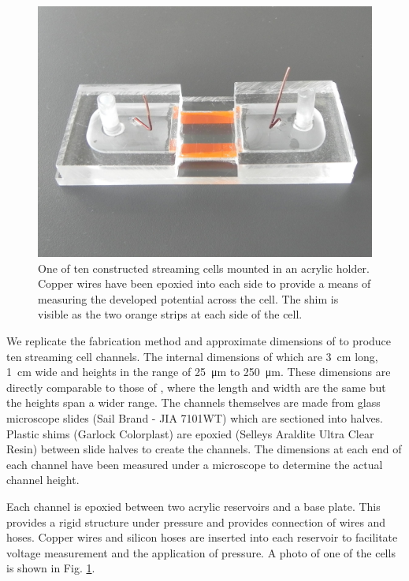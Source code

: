\documentclass[10pt,final,journal]{IEEEtran}
\begin{document}
    \begin{figure}
        \begin{center}
        \includegraphics[width=\linewidth]{Photo_streamingPotential_Assembly_Step3.JPG}
        \end{center}
        \caption{One of ten constructed streaming cells mounted in an acrylic holder. Copper wires have been epoxied into each side to provide a means of measuring the developed potential across the cell. The shim is visible as the two orange strips at each side of the cell.}
        \label{fig:cell}
    \end{figure}

    We replicate the fabrication method and approximate dimensions of \cite{Gu2000} to produce ten streaming cell channels.
    The internal dimensions of which are \SI{3}{\centi\metre} long, \SI{1}{\centi\metre} wide and heights in the range of \SI{25}{\micro\metre} to \SI{250}{\micro\metre}.
    These dimensions are directly comparable to those of \cite{Gu2000}, where the length and width are the same but the heights span a wider range.
    The channels themselves are made from glass microscope slides (Sail Brand - JIA 7101WT) which are sectioned into halves.
    Plastic shims (Garlock Colorplast) are epoxied (Selleys Araldite Ultra Clear Resin) between slide halves to create the channels.
    The dimensions at each end of each channel have been measured under a microscope to determine the actual channel height.

    Each channel is epoxied between two acrylic reservoirs and a base plate.
    This provides a rigid structure under pressure and provides connection of wires and hoses.
    Copper wires and silicon hoses are inserted into each reservoir to facilitate voltage measurement and the application of pressure.
    A photo of one of the cells is shown in Fig. \ref{fig:cell}.
    
\end{document}
